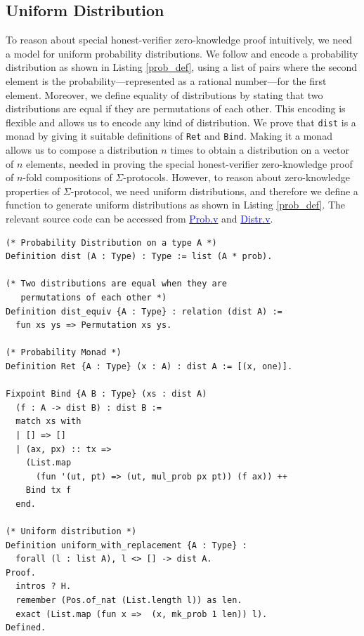 \documentclass[sigconf,anonymous,review]{acmart}
\begin{document}
\subsection{Uniform Distribution}\label{uniform_dist}
To reason about special honest-verifier zero-knowledge proof 
intuitively, we need a model for uniform probability distributions. 
We follow \cite{erwig2006functional}  and 
encode a probability distribution as shown in Listing \ref{prob_def}, using a list of pairs where the 
second element is the probability---represented as 
a rational number---for the first element.
Moreover, we define equality of distributions by 
stating that two distributions are equal if they are permutations 
of each other. This encoding is flexible and allows us 
to encode any kind of distribution. We prove that \texttt{dist} is a 
monad \cite{erwig2006functional} by 
giving it suitable definitions of \texttt{Ret} and 
\texttt{Bind}. Making it a monad allows us 
to compose a distribution $n$ times to 
obtain a distribution on a vector of $n$ elements, 
needed in proving the special honest-verifier 
zero-knowledge proof of $n$-fold compositions of $\Sigma$-protocols.
However, to reason about zero-knowledge properties of $\Sigma$-protocol, we need uniform 
distributions, and therefore we define a function 
\texttt{} to generate uniform distributions as shown in Listing \ref{prob_def}.
The relevant source code can be accessed from \href{https://anonymous.4open.science/r/SigmaProtocol-EBA5/src/Probability/Prob.v}{\textcolor{blue}{Prob.v}} and \href{https://anonymous.4open.science/r/SigmaProtocol-EBA5/src/Probability/Distr.v}{\textcolor{blue}{Distr.v}}.

\begin{lstlisting}[frame=single, language=Coq, caption={Uniform Probability Distribution},
    label={prob_def},captionpos=t, basicstyle=\ttfamily\footnotesize,
    abovecaptionskip=-\medskipamount]
(* Probability Distribution on a type A *)
Definition dist (A : Type) : Type := list (A * prob).

(* Two distributions are equal when they are 
   permutations of each other *)
Definition dist_equiv {A : Type} : relation (dist A) := 
  fun xs ys => Permutation xs ys.
  
(* Probability Monad *)
Definition Ret {A : Type} (x : A) : dist A := [(x, one)].

Fixpoint Bind {A B : Type} (xs : dist A)  
  (f : A -> dist B) : dist B := 
  match xs with 
  | [] => [] 
  | (ax, px) :: tx => 
    (List.map 
      (fun '(ut, pt) => (ut, mul_prob px pt)) (f ax)) ++ 
    Bind tx f
  end.

(* Uniform distribution *)
Definition uniform_with_replacement {A : Type} : 
  forall (l : list A), l <> [] -> dist A.
Proof.
  intros ? H.
  remember (Pos.of_nat (List.length l)) as len.
  exact (List.map (fun x =>  (x, mk_prob 1 len)) l).
Defined.
\end{lstlisting}
\end{document}
